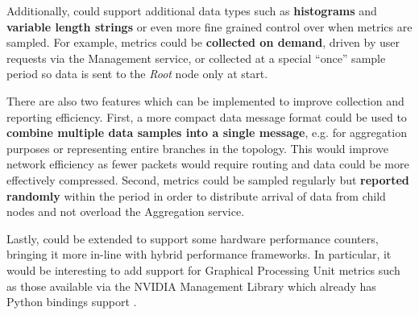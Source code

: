 Additionally, \dcamp could support additional data types such as \textbf{histograms} and \textbf{variable length
strings} or even more fine grained control over when metrics are sampled. For example, metrics could be
\textbf{collected on demand}, driven by user requests via the Management service, or collected at a special ``once''
sample period so data is sent to the \textit{Root} node only at start.

There are also two features which can be implemented to improve collection and reporting efficiency. First, a more
compact data message format could be used to \textbf{combine multiple data samples into a single message}, e.g. for
aggregation purposes or representing entire branches in the topology. This would improve network efficiency as fewer
packets would require routing and data could be more effectively compressed. Second, metrics could be sampled regularly
but \textbf{reported randomly} within the period in order to distribute arrival of data from child nodes and not
overload the Aggregation service.

Lastly, \dcamp could be extended to support some hardware performance counters, bringing it more in-line with hybrid
performance frameworks. In particular, it would be interesting to add support for Graphical Processing Unit metrics such
as those available via the NVIDIA Management Library \cite{needed} which already has Python bindings support
\cite{py-nvidia}.
